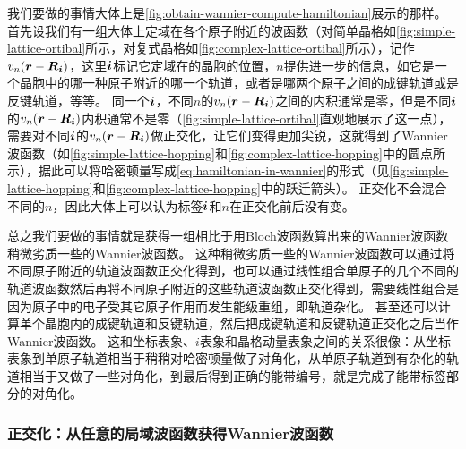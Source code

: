 我们要做的事情大体上是\autoref{fig:obtain-wannier-compute-hamiltonian}展示的那样。
首先设我们有一组大体上定域在各个原子附近的波函数（对简单晶格如\autoref{fig:simple-lattice-ortibal}所示，对复式晶格如\autoref{fig:complex-lattice-ortibal}所示），记作$v_{n}(\vb*{r} - \vb*{R}_{\vb*{i}})$，这里$\vb*{i}$标记它定域在的晶胞的位置，$n$提供进一步的信息，如它是一个晶胞中的哪一种原子附近的哪一个轨道，或者是哪两个原子之间的成键轨道或是反键轨道，等等。
同一个$\vb*{i}$，不同$n$的$v_n(\vb*{r} - \vb*{R}_{\vb*{i}})$之间的内积通常是零，但是不同$\vb*{i}$的$v_{n}(\vb*{r} - \vb*{R}_{\vb*{i}})$内积通常不是零（\autoref{fig:simple-lattice-ortibal}直观地展示了这一点），需要对不同$\vb*{i}$的$v_{n}(\vb*{r} - \vb*{R}_{\vb*{i}})$做正交化，让它们变得更加尖锐，这就得到了Wannier波函数（如\autoref{fig:simple-lattice-hopping}和\autoref{fig:complex-lattice-hopping}中的圆点所示），据此可以将哈密顿量写成\eqref{eq:hamiltonian-in-wannier}的形式（见\autoref{fig:simple-lattice-hopping}和\autoref{fig:complex-lattice-hopping}中的跃迁箭头）。
正交化不会混合不同的$n$，因此大体上可以认为标签$\vb*{i}$和$n$在正交化前后没有变。

总之我们要做的事情就是获得一组相比于用Bloch波函数算出来的Wannier波函数稍微劣质一些的Wannier波函数。
这种稍微劣质一些的Wannier波函数可以通过将不同原子附近的轨道波函数正交化得到，也可以通过线性组合单原子的几个不同的轨道波函数然后再将不同原子附近的这些轨道波函数正交化得到，需要线性组合是因为原子中的电子受其它原子作用而发生能级重组，即轨道杂化。
甚至还可以计算单个晶胞内的成键轨道和反键轨道，然后把成键轨道和反键轨道正交化之后当作Wannier波函数。
这和坐标表象、$i$表象和晶格动量表象之间的关系很像：从坐标表象到单原子轨道相当于稍稍对哈密顿量做了对角化，从单原子轨道到有杂化的轨道相当于又做了一些对角化，到最后得到正确的能带编号，就是完成了能带标签部分的对角化。

\subsubsection{正交化：从任意的局域波函数获得Wannier波函数}


